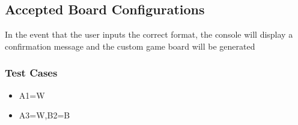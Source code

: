 \documentclass{article}
\begin{document}
\subsection{Accepted Board Configurations}
In the event that the user inputs the correct format, the console will display a confirmation message and the custom game board will be generated 

\subsubsection{Test Cases}
\begin{itemize}
\item A1=W
\item A3=W,B2=B
\end{itemize}
\end{document}
